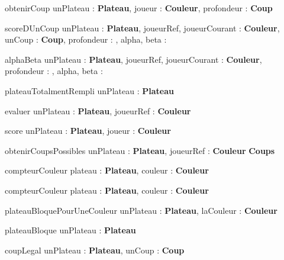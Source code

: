 
\begin{algorithme}
	\signaturefonction
	{obtenirCoup}
	{unPlateau : \textbf{Plateau}, joueur : \textbf{Couleur}, profondeur : \naturel}
	{\textbf{Coup}}
	
	\vspace{5mm}
	
	
	\signaturefonction
	{scoreDUnCoup}
	{unPlateau : \textbf{Plateau}, joueurRef, joueurCourant : \textbf{Couleur}, unCoup : \textbf{Coup}, profondeur : \naturel, alpha, beta : \entier}
	{\entier}
	
	\vspace{5mm}
	
	
	\signaturefonction
	{alphaBeta}
	{unPlateau : \textbf{Plateau}, joueurRef, joueurCourant : \textbf{Couleur}, profondeur : \naturel, alpha, beta : \entier}
	{\entier}
	
	\vspace{5mm}
	
	
	\signaturefonction
	{plateauTotalmentRempli}
	{unPlateau : \textbf{Plateau}}
	{\booleen}
	
	\vspace{5mm}
	
	
	\signaturefonction
	{evaluer}
	{unPlateau : \textbf{Plateau}, joueurRef : \textbf{Couleur}}
	{\entier}
	
	\vspace{5mm}
	
	
	\signaturefonction
	{score}
	{unPlateau : \textbf{Plateau}, joueur : \textbf{Couleur}}
	{\naturel}
	
	\vspace{5mm}
	
	
	\signaturefonction
	{obtenirCoupsPossibles}
	{unPlateau : \textbf{Plateau}, joueurRef : \textbf{Couleur}}
	{\textbf{Coups}}
	
	\vspace{5mm}
	
	\signaturefonction
	{compteurCouleur}
	{plateau : \textbf{Plateau}, couleur : \textbf{Couleur}}
	{\naturel}
	
	\vspace{5mm}
	
	\signaturefonction
	{compteurCouleur}
	{plateau : \textbf{Plateau}, couleur : \textbf{Couleur}}
	{\naturel}
	
	\vspace{5mm}
	
	\signaturefonction
	{plateauBloquePourUneCouleur}
	{unPlateau : \textbf{Plateau}, laCouleur : \textbf{Couleur}}
	{\booleen}
	
	\vspace{5mm}
	
	\signaturefonction
	{plateauBloque}
	{unPlateau : \textbf{Plateau}}
	{\booleen}
	
	\vspace{5mm}
	
	\signaturefonction
	{coupLegal}
	{unPlateau : \textbf{Plateau}, unCoup : \textbf{Coup}}
	{\booleen}
	
\end{algorithme}


